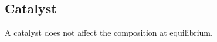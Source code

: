 \documentclass[a4paper,12pt]{article}
\begin{document}
\subsection{Catalyst}
A catalyst does not affect the composition at equilibrium.










\newpage
\end{document}
